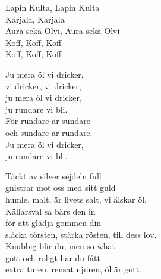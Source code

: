 \documentclass[a6paper,10pt]{article}
\begin{document}
\setlength{\oddsidemargin}{-0.47in}
\begin{center}
\end{center}
\begin{lyrics}
Lapin Kulta, Lapin Kulta\\
Karjala, Karjala\\
Aura sekä Olvi, Aura sekä Olvi\\
Koff, Koff, Koff\\
Koff, Koff, Koff
\end{lyrics}
\begin{center}
\end{center}
\begin{lyrics}
Ju mera öl vi dricker,\\
vi dricker, vi dricker,\\
ju mera öl vi dricker,\\
ju rundare vi bli.
\vspace{5pt} \\
För rundare är sundare\\
och sundare är rundare.\\
Ju mera öl vi dricker,\\
ju rundare vi bli.
\end{lyrics}
\begin{center}
\end{center}
\begin{lyrics}
Täckt av silver sejdeln full\\
gnistrar mot oss med sitt guld\\
humle, malt, är livets salt, vi älskar öl. 
\vspace{5pt}\\
Källarsval så bärs den in\\
för att glädja gommen din\\
släcka törsten, stärka rösten, till dess lov. 
\vspace{5pt}\\
Knubbig blir du, men so what\\
gott och roligt har du fått\\
extra turen, rensat njuren, öl är gott.
\end{lyrics}
\end{document}
